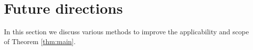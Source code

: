 \documentclass{article}
\theoremstyle{plain}
\theoremstyle{definition}
\theoremstyle{plain}
\theoremstyle{plain}
\theoremstyle{plain}
\newtheorem{lemma}[theorem]{Lemma}
\theoremstyle{remark}
\theoremstyle{remark}
\theoremstyle{plain}
\theoremstyle{plain}
\begin{document}
%
%
%
%
%

\section{Future directions}\label{sec:future}

In this section we discuss various methods to improve the applicability and scope of Theorem \ref{thm:main}. 

\end{document}
